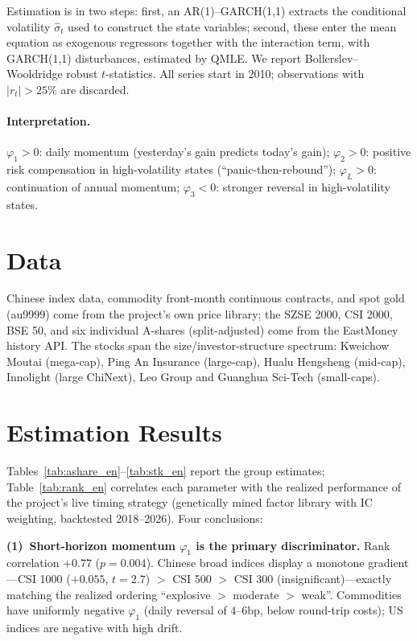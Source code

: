 \documentclass[11pt,a4paper]{article}
\begin{document}
Estimation is in two steps: first, an AR(1)--GARCH(1,1) extracts the conditional volatility $\hat\sigma_t$ used to construct the state variables; second, these enter the mean equation as exogenous regressors together with the interaction term, with GARCH(1,1) disturbances, estimated by QMLE. We report Bollerslev--Wooldridge robust $t$-statistics. All series start in 2010; observations with $|r_t|>25\%$ are discarded.

\paragraph{Interpretation.}$\varphi_1>0$: daily momentum (yesterday's gain predicts today's gain); $\varphi_2>0$: positive risk compensation in high-volatility states (``panic-then-rebound''); $\varphi_L>0$: continuation of annual momentum; $\varphi_3<0$: stronger reversal in high-volatility states.

\section{Data}
Chinese index data, commodity front-month continuous contracts, and spot gold (au9999) come from the project's own price library; the SZSE 2000, CSI 2000, BSE 50, and six individual A-shares (split-adjusted) come from the EastMoney history API. The stocks span the size/investor-structure spectrum: Kweichow Moutai (mega-cap), Ping An Insurance (large-cap), Hualu Hengsheng (mid-cap), Innolight (large ChiNext), Leo Group and Guanghua Sci-Tech (small-caps).

\section{Estimation Results}


Tables~\ref{tab:ashare_en}--\ref{tab:stk_en} report the group estimates; Table~\ref{tab:rank_en} correlates each parameter with the realized performance of the project's live timing strategy (genetically mined factor library with IC weighting, backtested 2018--2026). Four conclusions:

\textbf{(1)~Short-horizon momentum $\varphi_1$ is the primary discriminator.} Rank correlation $+0.77$ ($p=0.004$). Chinese broad indices display a monotone gradient---CSI 1000 ($+0.055$, $t=2.7$) $>$ CSI 500 $>$ CSI 300 (insignificant)---exactly matching the realized ordering ``explosive $>$ moderate $>$ weak''. Commodities have uniformly negative $\varphi_1$ (daily reversal of 4--6bp, below round-trip costs); US indices are negative with high drift.
\end{document}

